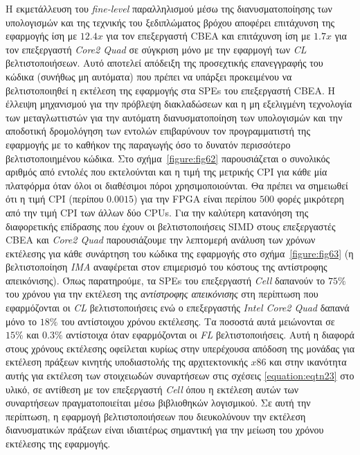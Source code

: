 Η εκμετάλλευση του \textsl{fine-level} παραλληλισμού μέσω της διανυσματοποίησης των υπολογισμών και της τεχνικής του ξεδιπλώματος βρόχου αποφέρει επιτάχυνση της εφαρμογής ίση με \(12.4x\) για τον επεξεργαστή \ac{CBEA} και επιτάχυνση ίση με \(1.7x\) για τον επεξεργαστή \textsl{Core2 Quad} σε σύγκριση μόνο με την εφαρμογή των \textsl{CL} βελτιστοποιήσεων. Αυτό αποτελεί απόδειξη της προσεχτικής επανεγγραφής του κώδικα (συνήθως μη αυτόματα) που πρέπει να υπάρξει προκειμένου να βελτιστοποιηθεί η εκτέλεση της εφαρμογής στα \acp{SPE} του επεξεργαστή \ac{CBEA}. Η έλλειψη μηχανισμού για την πρόβλεψη διακλαδώσεων και η μη εξελιγμένη τεχνολογία των μεταγλωττιστών για την αυτόματη διανυσματοποίηση των υπολογισμών και την αποδοτική δρομολόγηση των εντολών επιβαρύνουν τον προγραμματιστή της εφαρμογής με το καθήκον της παραγωγής όσο το δυνατόν περισσότερο βελτιστοποιημένου κώδικα.\newline
\indent
Στο σχήμα~\ref{figure:fig62} παρουσιάζεται ο συνολικός αριθμός από εντολές που εκτελούνται και η τιμή της μετρικής \ac{CPI} για κάθε μία πλατφόρμα όταν όλοι οι διαθέσιμοι πόροι χρησιμοποιούνται. Θα πρέπει να σημειωθεί ότι η τιμή \ac{CPI} (περίπου \(0.0015\)) για την \ac{FPGA} είναι περίπου \(500\) φορές μικρότερη από την τιμή \ac{CPI} των άλλων δύο \acp{CPU}.\newline \indent
Για την καλύτερη κατανόηση της διαφορετικής επίδρασης που έχουν οι βελτιστοποιήσεις \ac{SIMD} στους επεξεργαστές \ac{CBEA} και \textsl{Core2 Quad} παρουσιάζουμε την λεπτομερή ανάλυση των χρόνων εκτέλεσης για κάθε συνάρτηση του κώδικα της εφαρμογής στο σχήμα~\ref{figure:fig63} (η βελτιστοποίηση \textsl{IMA} αναφέρεται στον επιμερισμό του κόστους της αντίστροφης απεικόνισης). Όπως παρατηρούμε, τα \acp{SPE} του επεξεργαστή \textsl{Cell} δαπανούν το \(75\%\) του χρόνου για την εκτέλεση της \textsl{αντίστροφης απεικόνισης} στη περίπτωση που εφαρμόζονται οι \textsl{CL} βελτιστοποιήσεις ενώ ο επεξεργαστής \textsl{Intel Core2 Quad} δαπανά μόνο το \(18\%\) του αντίστοιχου χρόνου εκτέλεσης. Τα ποσοστά αυτά μειώνονται σε \(15\%\) και \(0.3\%\) αντίστοιχα όταν εφαρμόζονται οι \textsl{FL} βελτιστοποιήσεις.\newline \indent
Αυτή η διαφορά στους χρόνους εκτέλεσης οφείλεται κυρίως στην υπερέχουσα απόδοση της μονάδας για εκτέλεση πράξεων κινητής υποδιαστολής της αρχιτεκτονικής \(x86\) και στην ικανότητα αυτής για εκτέλεση των στοιχειωδών συναρτήσεων στις σχέσεις \eqref{equation:eqtn23} στο υλικό, σε αντίθεση με τον επεξεργαστή \textsl{Cell} όπου η εκτέλεση αυτών των συναρτήσεων πραγματοποιείται μέσω βιβλιοθηκών λογισμικού. Σε αυτή την περίπτωση, η εφαρμογή βελτιστοποιήσεων που διευκολύνουν την εκτέλεση διανυσματικών πράξεων είναι ιδιαιτέρως σημαντική για την μείωση του χρόνου εκτέλεσης της εφαρμογής.
